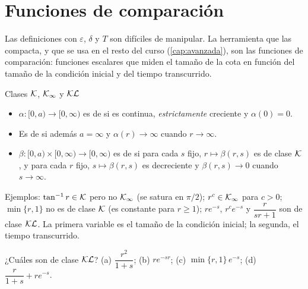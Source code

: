 \section{Funciones de comparación}
\label{sec:vt-comparacion}

Las definiciones con $\varepsilon$, $\delta$ y $T$ son difíciles de manipular. La herramienta que las compacta, y que se usa en el resto del curso (\cref{cap:avanzada}), son las funciones de comparación: funciones escalares que miden el tamaño de la cota en función del tamaño de la condición inicial y del tiempo transcurrido.

\begin{definicion}[label=def:vt-clases]{Clases $\mathcal{K}$, $\mathcal{K}_{\infty}$ y $\mathcal{KL}$ \citep[Def.~4.2 y 4.3]{Kha02}}
\begin{itemize}
  \item $\alpha:[0,a)\to[0,\infty)$ es de  si es continua, \emph{estrictamente} creciente y $\alpha(0)=0$.
  \item Es de  si además $a=\infty$ y $\alpha(r)\to\infty$ cuando $r\to\infty$.
  \item $\beta:[0,a)\times[0,\infty)\to[0,\infty)$ es de  si para cada $s$ fijo, $r\mapsto\beta(r,s)$ es de clase $\mathcal{K}$, y para cada $r$ fijo, $s\mapsto\beta(r,s)$ es decreciente y $\beta(r,s)\to0$ cuando $s\to\infty$.
\end{itemize}
\end{definicion}

Ejemplos: $\tan^{-1}r\in\mathcal{K}$ pero no $\mathcal{K}_{\infty}$ (se satura en $\pi/2$); $r^c\in\mathcal{K}_{\infty}$ para $c>0$; $\min\{r,1\}$ no es de clase $\mathcal{K}$ (es constante para $r\ge1$); $re^{-s}$, $r^c e^{-s}$ y $\dfrac{r}{sr+1}$ son de clase $\mathcal{KL}$. La primera variable es el tamaño de la condición inicial; la segunda, el tiempo transcurrido.

\begin{pausa}
¿Cuáles son de clase $\mathcal{KL}$? (a) $\dfrac{r^2}{1+s}$; (b) $re^{-sr}$; (c) $\min\{r,1\}\,e^{-s}$; (d) $\dfrac r{1+s}+re^{-s}$.
\end{pausa}

